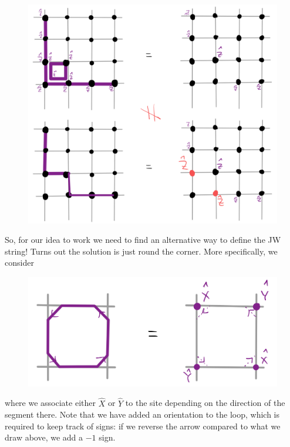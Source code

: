 \begin{figure}[H]
    \centering
    \includegraphics[width=\textwidth]{jupyterbook/data/fig/lec26-fig13.png}
\end{figure}
So, for our idea to work we need to find an alternative way to define the JW string! Turns out the solution is just round the corner. More specifically, we consider
\begin{figure}[H]
    \centering
    \includegraphics[width=\textwidth]{jupyterbook/data/fig/lec26-fig14.png}
\end{figure}
where we associate either $\hat{X}$ or $\hat{Y}$ to the site depending on the direction of the segment there. Note that we have added an orientation to the loop, which is required to keep track of signs: if we reverse the arrow compared to what we draw above, we add a $-1$ sign.


